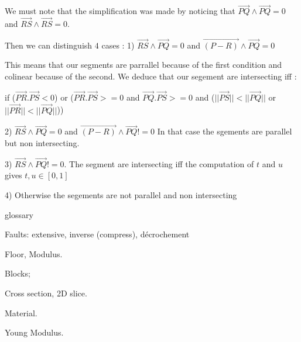 \documentclass[12pt, a4paper]{memoir} %
\begin{document}
We must note that the simplification was made by noticing that $\overrightarrow{PQ} \wedge \overrightarrow{PQ} = 0$ and $\overrightarrow{RS} \wedge \overrightarrow{RS} = 0$.

Then we can distinguish $4$ cases :
1) $ \overrightarrow{RS} \wedge \overrightarrow{PQ} = 0$ and $\overrightarrow{(P - R)} \wedge \overrightarrow{PQ} = 0$

This means that our segments are parrallel because of the first condition and colinear because of the second. We deduce that our segement are intersecting 
iff :

if ($\overrightarrow{PR}.\overrightarrow{PS} < 0$) or ($\overrightarrow{PR}.\overrightarrow{PS} >= 0$ and $\overrightarrow{PQ}.\overrightarrow{PS} >= 0$ and ($||\overrightarrow{PS}|| < ||\overrightarrow{PQ}||$ or $||\overrightarrow{PR}|| < ||\overrightarrow{PQ}||$))

2)  $ \overrightarrow{RS} \wedge \overrightarrow{PQ} = 0$ and $\overrightarrow{(P - R)} \wedge \overrightarrow{PQ} != 0$
In that case the sgements are parallel but non intersecting.

3)  $ \overrightarrow{RS} \wedge \overrightarrow{PQ} != 0$.
The segment are intersecting iff the computation of $t$ and $u$ gives $t,u \in [0,1]$

4) Otherwise the segements are not parallel and non intersecting


glossary
	
Faults: extensive, inverse (compress), décrochement

Floor, Modulus.

Blocks;

Cross section, 2D slice.

Material.

Young Modulus.
\end{document}
